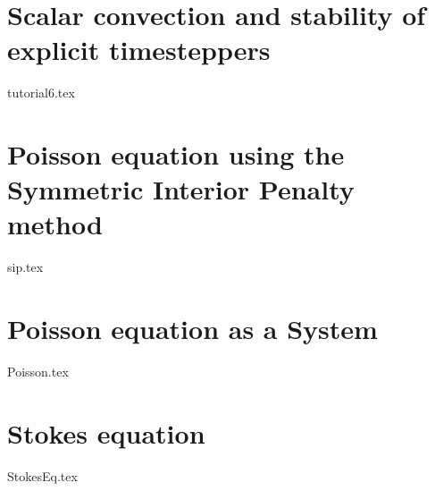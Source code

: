 \documentclass[a4paper,10pt]{report} %
\begin{document}
\chapter{Scalar convection and stability of explicit timesteppers}
\label{ScalarAdvection}
{tutorial6.tex}





\chapter{Poisson equation using the Symmetric Interior Penalty method}
\label{sec:SIP}
{sip.tex}

\chapter{Poisson equation as a System}
\label{sec:PoissonAsASystem}
{Poisson.tex}

\chapter{Stokes equation}
\label{sec:Stokes}
{StokesEq.tex}
\end{document}
